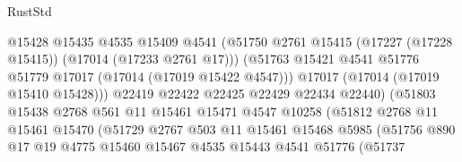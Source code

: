 \begin{lexlean}{RustStd}
\begin{coremodule}
{\begin{coremodule}
{{{{{{{{{{{{{{{{{{{{{{{{{{{{{{{{{{{{{{{{{{{{{{{{{{{{{{{                                    @15428
                                    @15435
                                    @4535
                                    @15409
                                    @4541
                                    (@51750
                                      @2761
                                      @15415
                                      (@17227 (@17228 @15415))
                                      (@17014 (@17233 @2761 @17)))
                                    (@51763
                                      @15421
                                      @4541
                                      @51776
                                      @51779
                                      @17017
                                      (@17014 (@17019 @15422 @4547)))
                                    @17017
                                    (@17014 (@17019 @15410 @15428)))
                                  @22419
                                  @22422
                                  @22425
                                  @22429
                                  @22434
                                  @22440)
                                (@51803
                                  @15438
                                  @2768
                                  @561
                                  @11
                                  @15461
                                  @15471
                                  @4547
                                  @10258
                                  (@51812
                                    @2768
                                    @11
                                    @15461
                                    @15470
                                    (@51729
                                      @2767
                                      @503
                                      @11
                                      @15461
                                      @15468
                                      @5985
                                      (@51756
                                        @890
                                        @17
                                        @19
                                        @4775
                                        @15460
                                        @15467
                                        @4535
                                        @15443
                                        @4541
                                        @51776
                                        (@51737
}}}}}}}}}}}}}}}}}}}}}}}}}}}}}}}}}}}}}}}}}}}}}}}}}}}}}}}
\end{coremodule}}
\end{coremodule}
\end{lexlean}
